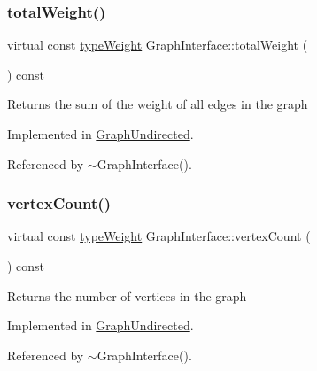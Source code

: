 \subsubsection{\texorpdfstring{total\+Weight()}{totalWeight()}}
{\footnotesize\ttfamily virtual const \hyperlink{edge_8h_a2e7ea3be891ac8b52f749ec73fee6dd2}{type\+Weight} Graph\+Interface\+::total\+Weight (\begin{DoxyParamCaption}{ }\end{DoxyParamCaption}) const\hspace{0.3cm}{\ttfamily [pure virtual]}}

\begin{DoxyReturn}{Returns}
the sum of the weight of all edges in the graph 
\end{DoxyReturn}


Implemented in \hyperlink{classGraphUndirected_a41ba96531c669461dbc7e11ee35796ab}{Graph\+Undirected}.



Referenced by $\sim$\+Graph\+Interface().

\mbox{\label{classGraphInterface_a483f64f8d37af2b363f2f4eb37943dfd}} 
\subsubsection{\texorpdfstring{vertex\+Count()}{vertexCount()}}
{\footnotesize\ttfamily virtual const \hyperlink{edge_8h_a2e7ea3be891ac8b52f749ec73fee6dd2}{type\+Weight} Graph\+Interface\+::vertex\+Count (\begin{DoxyParamCaption}{ }\end{DoxyParamCaption}) const\hspace{0.3cm}{\ttfamily [pure virtual]}}

\begin{DoxyReturn}{Returns}
the number of vertices in the graph 
\end{DoxyReturn}


Implemented in \hyperlink{classGraphUndirected_adf50305970536f71586f8f63462dfcdc}{Graph\+Undirected}.



Referenced by $\sim$\+Graph\+Interface().

\mbox{\label{classGraphInterface_a27f350094f566bb4840f22c5bc0695c4}} 
